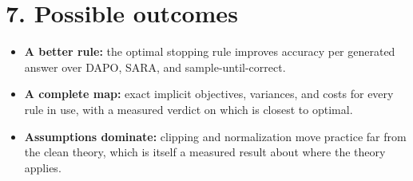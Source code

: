 \documentclass[11pt]{article}
\begin{document}
\section{7. Possible outcomes}
\begin{itemize}[leftmargin=*,itemsep=2pt,topsep=2pt]
\item \textbf{A better rule:} the optimal stopping rule improves accuracy per generated answer over DAPO, SARA, and sample-until-correct.
\item \textbf{A complete map:} exact implicit objectives, variances, and costs for every rule in use, with a measured verdict on which is closest to optimal.
\item \textbf{Assumptions dominate:} clipping and normalization move practice far from the clean theory, which is itself a measured result about where the theory applies.
\end{itemize}



\end{document}
